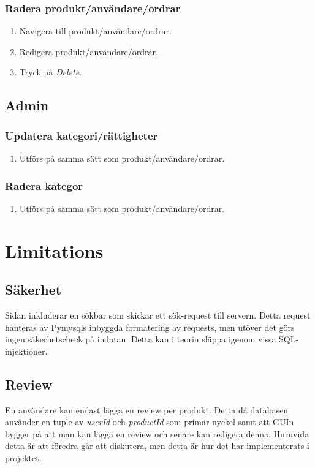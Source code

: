 \documentclass[a4paper]{article}
\begin{document}
\subsubsection{Radera produkt/användare/ordrar}
\begin{enumerate}
  \item Navigera till produkt/användare/ordrar.
  \item Redigera produkt/användare/ordrar.
  \item Tryck på \textit{Delete}.
\end{enumerate}
%
\subsection{Admin}
\subsubsection{Updatera kategori/rättigheter}
\begin{enumerate}
  \item Utförs på samma sätt som produkt/användare/ordrar.
\end{enumerate}
%
\subsubsection{Radera kategor}
\begin{enumerate}
  \item Utförs på samma sätt som produkt/användare/ordrar.
\end{enumerate}
%
\section{Limitations}
\subsection{Säkerhet}
Sidan inkluderar en sökbar som skickar ett sök-request till servern. Detta request hanteras av Pymysqls inbyggda formatering av requests, men utöver det görs ingen säkerhetscheck på indatan. Detta kan i teorin släppa igenom vissa SQL-injektioner.
%
\subsection{Review}
En användare kan endast lägga en review per produkt. Detta då databasen använder en tuple av \textit{userId} och \textit{productId} som primär nyckel samt att GUIn bygger på att man kan lägga en review och senare kan redigera denna. Huruvida detta är att föredra går att diskutera, men detta är hur det har implementerats i projektet.
%
\end{document}
